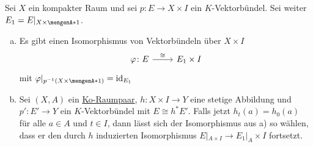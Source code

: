 \begin{theorem}[{name=[{Isomorphismus von Vektorbündeln $E$ und $E|_{X \times \set{1}} \times I$ für $X$ kompakt}]},label=iso_vektb_intervall]
Sei $X$ ein kompakter Raum und sei $p \colon E\to X \times I$ ein $K$-Vektorbündel. Sei weiter $E_1 = E|_{X \times \set{1}}$.
\begin{enumerate}[a)]
	\item Es gibt einen Isomorphismus von Vektorbündeln über $X \times I$
	\[
		\begin{tikzcd}
			\varphi \colon E \rar["\cong"]  & E_1 \times I 
		\end{tikzcd}
	\]
	mit $\varphi|_{p ^{-1}(X \times \set{1})} =\id_{E_1}$
	\item Sei $(X,A)$ ein \hyperref[def_koraumpaar]{Ko-Raumpaar}, $h \colon X \times I \to Y$ eine stetige Abbildung und $p' \colon E' \to Y$ ein $K$-Vektorbündel mit $E \cong h^* E'$. Falls jetzt
	$h_t(a)=h_0(a)$ für alle $a \in A$ und $t \in I$, dann lässt sich der Isomorphismus aus a) so wählen, dass er den durch $h$ induzierten Isomorphismus 
	$E|_{A \times I} \to E_1|_{A} \times I$ fortsetzt.
\end{enumerate}	
\end{theorem}

